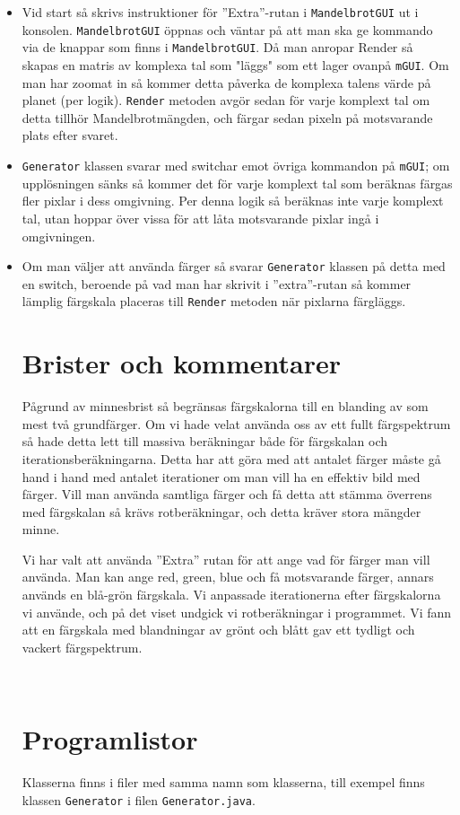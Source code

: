 \documentclass[a4paper]{article}
\newcommand{\code}[1]{\texttt{#1}} %
\begin{document}
\begin{itemize}
\item Vid start så skrivs instruktioner för ''Extra''-rutan i \code{MandelbrotGUI} ut i konsolen. 
\code{MandelbrotGUI} öppnas och väntar på att man ska ge kommando via de knappar som finns i \code{MandelbrotGUI}. Då man anropar Render så skapas en matris av komplexa tal som "läggs" som ett lager ovanpå \texttt{mGUI}. Om man har zoomat in så kommer detta påverka de komplexa talens värde på planet (per logik).
\texttt{Render} metoden avgör sedan för varje komplext tal om detta tillhör Mandelbrotmängden, och färgar sedan pixeln på motsvarande plats efter svaret.
\item \texttt{Generator} klassen svarar med switchar emot övriga kommandon på \texttt{mGUI}; om upplösningen sänks så kommer det för varje komplext tal som beräknas färgas fler pixlar i dess omgivning. Per denna logik så beräknas inte varje komplext tal, utan hoppar över vissa för att låta motsvarande pixlar ingå i omgivningen.
\item Om man väljer att använda färger så svarar \texttt{Generator} klassen på detta med en switch, beroende på vad man har skrivit i ''extra''-rutan så kommer lämplig färgskala placeras till \texttt{Render} metoden när pixlarna färgläggs.
\\
\section{Brister och kommentarer}
Pågrund av minnesbrist så begränsas färgskalorna till en blanding av som mest två grundfärger. Om vi hade velat använda oss av ett fullt färgspektrum så hade detta lett till massiva beräkningar både för färgskalan och iterationsberäkningarna. Detta har att göra med att antalet färger måste gå hand i hand med antalet iterationer om man vill ha en effektiv bild med färger.
Vill man använda samtliga färger och få detta att stämma överrens med färgskalan så krävs rotberäkningar, och detta kräver stora mängder minne.

Vi har valt att använda ''Extra'' rutan för att ange vad för färger man vill använda. Man kan ange red, green, blue och få motsvarande färger, annars används en blå-grön färgskala. Vi anpassade iterationerna efter färgskalorna vi använde, och på det viset undgick vi rotberäkningar i programmet. Vi fann att en färgskala med blandningar av grönt och blått gav ett tydligt och vackert färgspektrum.

\\
\section{Programlistor}
Klasserna finns i filer med samma namn som klasserna, till exempel finns klassen \code{Generator} i filen \code{Generator.java}.


\end{itemize}
\end{document}
